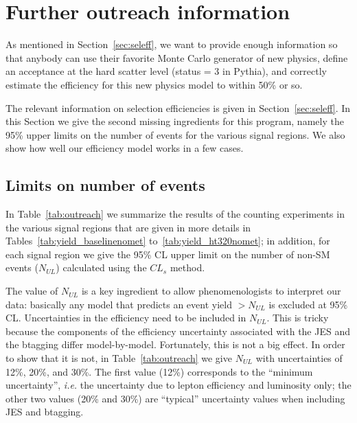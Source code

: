 

\section{Further outreach information}
\label{sec:outreach}
As mentioned in Section~\ref{sec:seleff}, we want to provide 
enough information so that anybody can use their favorite Monte Carlo
generator of new physics, define an acceptance at the hard 
scatter level (status = 3 in Pythia), and correctly estimate
the efficiency for this new physics model to within 50\% or so.

The relevant information on selection efficiencies is 
given in Section~\ref{sec:seleff}.  In this Section we give the 
second missing ingredients for this program, namely the 
95\% upper limits on the number of events for the various 
signal regions.  We also show how well our efficiency model 
works in a few cases.

\subsection{Limits on number of events}
\label{sec:outreachlimits}
In Table~\ref{tab:outreach} we summarize the 
results of the counting experiments in the various signal 
regions that are given in more 
details in Tables~\ref{tab:yield_baselinenomet} 
to~\ref{tab:yield_ht320nomet}; in addition, for each signal 
region we give the 95\% CL upper limit on the number of 
non-SM events ($N_{UL}$) calculated using the $CL_s$ method.

The value of $N_{UL}$ is a key ingredient to allow phenomenologists
to interpret our data: basically any model that predicts an 
event yield $> N_{UL}$ is excluded at 95\% CL.  Uncertainties 
in the efficiency need to be included in $N_{UL}$.  This is tricky 
because the components of the efficiency uncertainty associated 
with the JES and the btagging differ model-by-model.  Fortunately,
this is not a big effect.  In order to show that it is not, in 
Table~\ref{tab:outreach} we give $N_{UL}$ with uncertainties of 
12\%, 20\%, and 30\%. The first value (12\%) corresponds to the 
``minimum uncertainty'', {\em i.e.} the uncertainty due to 
lepton efficiency and luminosity only; the other two values (20\%
and 30\%) are ``typical'' uncertainty values when including
JES and btagging.


